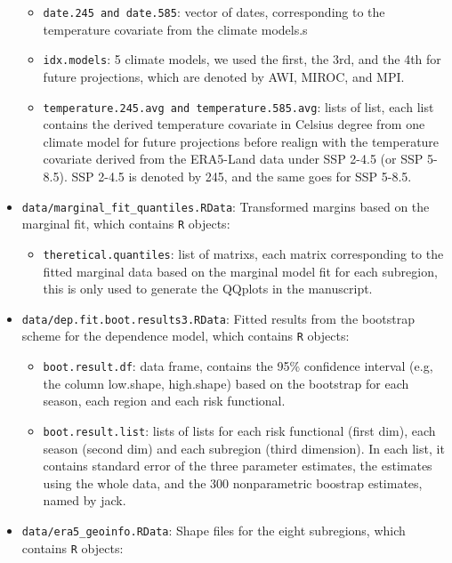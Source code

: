 \documentclass[
]{article}
\providecommand{\tightlist}{%
  \setlength{\itemsep}{0pt}\setlength{\parskip}{0pt}}
\begin{document}
\begin{itemize}
  \begin{itemize}
  \tightlist
  \item
    \texttt{date.245\ and\ date.585}: vector of dates, corresponding to
    the temperature covariate from the climate models.s
  \item
    \texttt{idx.models}: 5 climate models, we used the first, the 3rd,
    and the 4th for future projections, which are denoted by AWI, MIROC,
    and MPI.
  \item
    \texttt{temperature.245.avg\ and\ temperature.585.avg}: lists of
    list, each list contains the derived temperature covariate in
    Celsius degree from one climate model for future projections before
    realign with the temperature covariate derived from the ERA5-Land
    data under SSP 2-4.5 (or SSP 5-8.5). SSP 2-4.5 is denoted by 245,
    and the same goes for SSP 5-8.5.\\
  \end{itemize}
\item
  \texttt{data/marginal\_fit\_quantiles.RData}: Transformed margins
  based on the marginal fit, which contains \texttt{R} objects:

  \begin{itemize}
  \tightlist
  \item
    \texttt{theretical.quantiles}: list of matrixs, each matrix
    corresponding to the fitted marginal data based on the marginal
    model fit for each subregion, this is only used to generate the
    QQplots in the manuscript.
  \end{itemize}
\item
  \texttt{data/dep.fit.boot.results3.RData}: Fitted results from the
  bootstrap scheme for the dependence model, which contains \texttt{R}
  objects:

  \begin{itemize}
  \tightlist
  \item
    \texttt{boot.result.df}: data frame, contains the 95\% confidence
    interval (e.g, the column low.shape, high.shape) based on the
    bootstrap for each season, each region and each risk functional.
  \item
    \texttt{boot.result.list}: lists of lists for each risk functional
    (first dim), each season (second dim) and each subregion (third
    dimension). In each list, it contains standard error of the three
    parameter estimates, the estimates using the whole data, and the 300
    nonparametric boostrap estimates, named by jack.\\
  \end{itemize}
\item
  \texttt{data/era5\_geoinfo.RData}: Shape files for the eight
  subregions, which contains \texttt{R} objects:


\end{itemize}
\end{document}
